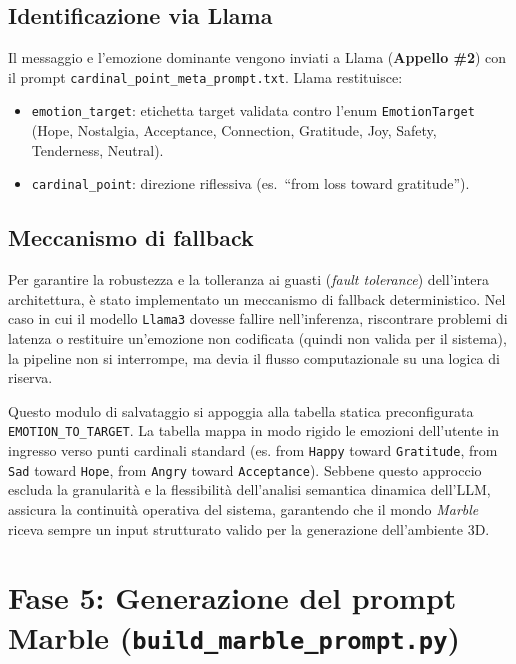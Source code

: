 \documentclass[11pt]{report}
\begin{document}
\subsection{Identificazione via Llama}
 
Il messaggio e l'emozione dominante vengono inviati a Llama (\textbf{Appello \#2}) con il prompt \texttt{cardinal\_point\_meta\_prompt.txt}. Llama restituisce:
\begin{itemize}
    \item \texttt{emotion\_target}: etichetta target validata contro l'enum \texttt{EmotionTarget} (Hope, Nostalgia, Acceptance, Connection, Gratitude, Joy, Safety, Tenderness, Neutral).
    \item \texttt{cardinal\_point}: direzione riflessiva (es.\ ``from loss toward gratitude'').
\end{itemize}
 
\subsection{Meccanismo di fallback}

Per garantire la robustezza e la tolleranza ai guasti (\textit{fault tolerance}) dell'intera architettura, è stato implementato un meccanismo di fallback deterministico. Nel caso in cui il modello \texttt{Llama3} dovesse fallire nell'inferenza, riscontrare problemi di latenza o restituire un'emozione non codificata (quindi non valida per il sistema), la pipeline non si interrompe, ma devia il flusso computazionale su una logica di riserva.

Questo modulo di salvataggio si appoggia alla tabella statica preconfigurata \texttt{EMOTION\_TO\_TARGET}. La tabella mappa in modo rigido le emozioni dell'utente in ingresso verso punti cardinali standard (es. from \texttt{Happy} toward \texttt{Gratitude}, from \texttt{Sad} toward \texttt{Hope}, from \texttt{Angry} toward \texttt{Acceptance}). Sebbene questo approccio escluda la granularità e la flessibilità dell'analisi semantica dinamica dell'LLM, assicura la continuità operativa del sistema, garantendo che il mondo \textit{Marble} riceva sempre un input strutturato valido per la generazione dell'ambiente 3D.

 
\section{Fase 5: Generazione del prompt Marble (\texttt{build\_marble\_prompt.py})}
 
\end{document}
